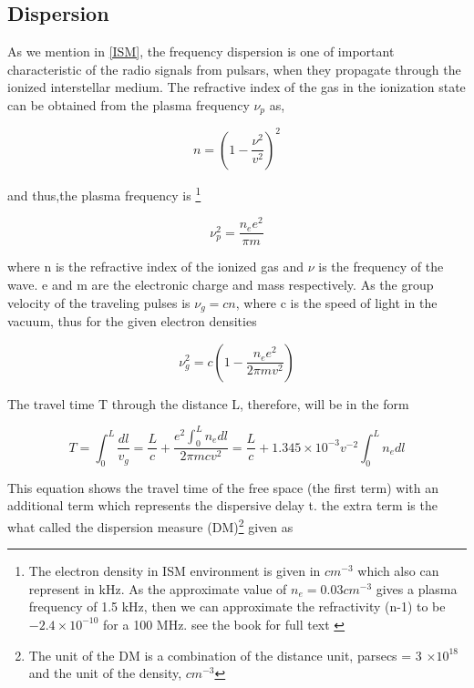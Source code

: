 \subsection{Dispersion}
\label{Dispersion}
As we mention in \cref{ISM}, the frequency dispersion is one of important characteristic of the radio signals from pulsars, when they propagate through the ionized interstellar medium. The refractive index of the gas in the ionization state can be obtained from the plasma frequency $\nu_{p}$ as,

\begin{equation}
\label{revractive index}
n = \left(1- \frac{\nu^{2}}{v^2} \right)^2
\end{equation}

and thus,the plasma frequency is \footnote{The electron density in ISM environment is given in $cm^{-3}$ which also can represent in kHz. As the approximate value of $n_e=0.03 cm^{-3}$ gives a plasma frequency of 1.5 kHz, then we can approximate the refractivity (n-1) to be $-2.4  \times10^{-10}$ for a 100 MHz. see the book for full text \cite{lyne2012pulsar} }  

\begin{equation}
\label{revractive index1}
\nu_p^2 = \frac{n_e e^{2}}{\pi m}
\end{equation}

where n is the refractive index of the ionized gas and $\nu$ is the frequency of the wave. e and m are the electronic charge and mass respectively. As the group velocity of the traveling pulses is $\nu_g = cn$, where c is the speed of light in the vacuum, thus for the given electron densities 

\begin{equation}
\label{group velocity}
\nu_g^2 = c \left(1 - \frac{n_e e^{2}}{2\pi m v^2} \right)
\end{equation}

The travel time T through the distance L, therefore, will be in the form 

\begin{equation}
\label{Travel Time}
T = \int_0^L \frac{dl}{v_g} = \frac{L}{c} + \frac{e^2 \int_0^L n_e dl}{2 \pi mcv^2}  = \frac{L}{c} + 1.345 \times 10^{-3} v^{-2} \int_0^L n_e dl  
\end{equation}

This equation shows the travel time of the free space (the first term) with an additional term which represents the dispersive delay t. the 
extra term is the what called the dispersion measure (DM)\footnote{The unit of the DM is a combination of the distance unit, parsecs = 3 $\times10^{18}$ and  the unit of the density, $cm^{-3}$ } given as

